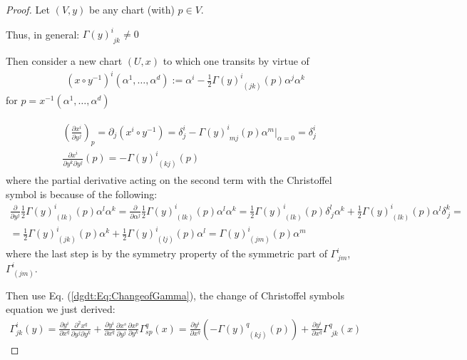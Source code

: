 \begin{proof}
	Let $(V,y)$ be any chart (with) $p\in V$.
	
	Thus, in general: $\Gamma(y)^i_{\,\, jk} \neq 0$
	
	Then consider a new chart $(U, x)$ to which one transits by virtue of 
	\[
	\begin{gathered}
		(x\circ y^{-1})^{i}(\alpha^1, \dots, \alpha^d) := \alpha^i - \frac{1}{2} \Gamma(y)^i_{\,\, (jk)}(p) \alpha^j \alpha^k 
	\end{gathered}
	\]
	for $p = x^{-1}(\alpha^1, \dots , \alpha^d)$
	
	\[
	\begin{gathered}
		\begin{aligned} 
			& \left(\frac{\partial x^i}{ \partial y^j}\right)_p = \partial_j (x^i \circ y^{-1}) = \delta^i_j - \Gamma(y)^i_{\,\, mj}(p) \left. \alpha^m \right|_{\alpha = 0} = \delta^i_j \\
			& \frac{\partial x^i}{ \partial y^k \partial y^j}(p) = - \Gamma(y)^i_{ \, \, (kj)} (p)
		\end{aligned} 
	\end{gathered}
	\]
where the partial derivative acting on the second term with the Christoffel symbol is because of the following:
\[
\begin{gathered}
	\frac{\partial}{\partial y^j} \frac{1}{2} \Gamma(y)^i_{\, (lk)} (p) \alpha^l \alpha^k = \frac{\partial}{\partial \alpha^j} \frac{1}{2} \Gamma(y)^i_{\, (lk)} (p) \alpha^l \alpha^k = \frac{1}{2} \Gamma(y)^i_{\, (lk)} (p) \delta^l_{\, j} \alpha^k + \frac{1}{2} \Gamma(y)^i_{\, (lk)} (p) \alpha^l \delta^k_{\, j} = \\
	= \frac{1}{2} \Gamma(y)^i_{\, (jk)} (p)  \alpha^k + \frac{1}{2} \Gamma(y)^i_{\, (lj)} (p)  \alpha^l = \Gamma(y)^i_{\, (jm)}(p) \alpha^m
\end{gathered}
\]
where the last step is by the symmetry property of the symmetric part of $\Gamma^i_{\, jm}$, $\Gamma^i_{\, (jm)}$.

Then use Eq. (\ref{dgdt:Eq:ChangeofGamma}), the change of Christoffel symbols equation we just derived:
\[
\begin{gathered}
\Gamma^i_{jk}(y) = \frac{ \partial y^i}{ \partial x^q} \frac{ \partial^2 x^q}{ \partial y^j \partial y^k} + \frac{ \partial y^i}{ \partial x^q } \frac{ \partial x^s }{ \partial y^j} \frac{ \partial x^p }{ \partial y^k} \Gamma^q_{sp}(x)	= \frac{ \partial y^i}{ \partial x^q} \left( - \Gamma(y)^q_{ \, \, (kj)} (p) \right) + \frac{ \partial y^i}{ \partial x^q } \Gamma^q_{ \, \, jk} (x)
\end{gathered}
\]


\end{proof}
